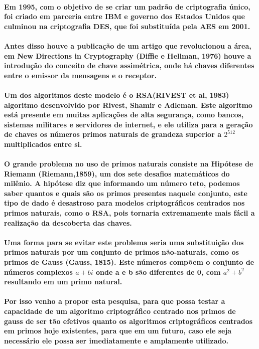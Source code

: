 \documentclass{article}
\begin{document}
	\paragraph{
		Em 1995, com o objetivo de se criar um padrão de criptografia único, foi criado em parceria entre IBM e governo dos Estados Unidos que culminou na criptografia DES, que foi substituída pela AES em 2001. 
	}
	\paragraph{
		Antes disso houve a publicação de um artigo que revolucionou a área, em New Directions in Cryptography (Diffie e Hellman, 1976) houve a introdução do conceito de chave assimétrica, onde há chaves diferentes entre o emissor da mensagens e o receptor.
	}
	\paragraph{
		Um dos algoritmos deste modelo é o RSA(RIVEST et al, 1983) algoritmo  desenvolvido por Rivest, Shamir e Adleman. Este algoritmo está presente em muitas aplicações de alta segurança, como bancos, sistemas militares e servidores de internet, e ele utiliza para a geração de chaves os números primos naturais de grandeza superior a $2^{512}$ multiplicados entre si.
	}
	\paragraph{
		O grande problema no uso de primos naturais consiste na Hipótese de Riemann (Riemann,1859), um dos sete desafios matemáticos do milênio. A hipótese diz que informando um número teto, podemos saber quantos e quais são os primos presentes naquele conjunto, este tipo de dado é desastroso para modelos criptográficos centrados nos primos naturais, como o RSA, pois tornaria extremamente mais fácil a realização da descoberta das chaves.
	}
	\paragraph{
		Uma forma para se evitar este problema seria uma substituição dos primos naturais por um conjunto de primos não-naturais, como os primos de Gauss (Gauss, 1815). Este números compõem o conjunto de números complexos $a+bi$ onde a e b são diferentes de 0, com $a^2+b^2$ resultando em um primo natural.
	}
	\paragraph{
		Por isso venho a propor esta pesquisa, para que possa testar a capacidade de um algoritmo criptográfico centrado nos primos de gauss de ser tão efetivos quanto os algoritmos criptográficos centrados em primos hoje existentes, para que em um futuro, caso ele seja necessário ele possa ser imediatamente e amplamente utilizado.
	}
\end{document}
